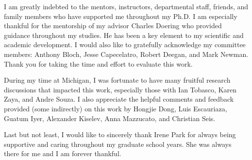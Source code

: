 I am greatly indebted to the mentors, instructors, departmental staff, friends, and family members who have supported me throughout my Ph.D. I am especially thankful for the mentorship of my advisor Charles Doering who  provided guidance throughout my studies. He has been a key element to my scientific and academic development. I would also like to gratefully acknowledge my committee members: Anthony Bloch, Jesse Capecelatro, Robert Deegan, and Mark Newman. Thank you for taking the time and effort to evaluate this work.

During my time at Michigan, I was fortunate to have many fruitful research discussions that impacted this work, especially those with Ian Tobasco, Karen Zaya, and Andre Souza. I also appreciate the helpful comments and feedback provided (some indirectly) on this work by Hongjie Dong, Luis Escauriaza, Guatum Iyer, Alexander Kiselev, Anna Mazzucato, and Christian Seis.

%

Last but not least, I would like to sincerely thank Irene Park for always being supportive and caring throughout my graduate school years. She was always there for me and I am forever thankful. 